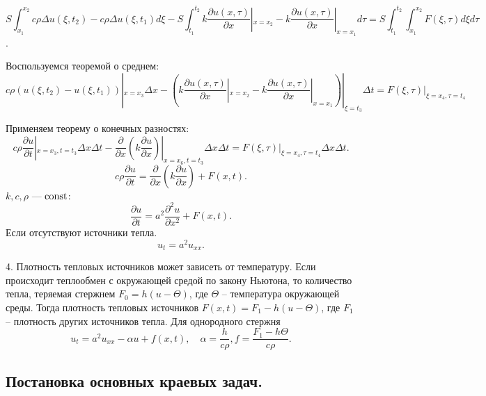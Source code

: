 \documentclass[9pt]{article}
\begin{document}
\[S\int_{x_1}^{x_2}c\rho\Delta u(\xi,t_2)-c\rho\Delta u(\xi,t_1)d\xi-S
\int_{t_1}^{t_2}k\dfrac{\partial u(x,\tau)}{\partial x}|_{x=x_2}-k\dfrac{\partial u(x,\tau)}{\partial x}|_{x=x_1}d\tau=S\int_{t_1}^{t_2}\int_{x_1}^{x_2}F(\xi,\tau)d\xi d\tau\].
\par Воспользуемся теоремой о среднем:
\[c\rho (u(\xi,t_2)-u(\xi,t_1))|_{x=x_3}\Delta x-(k\dfrac{\partial u(x,\tau)}{\partial x}|_{x=x_2}-k\dfrac{\partial u(x,\tau)}{\partial x}|_{x=x_1})|_{\xi=t_3}\Delta t=F(\xi,\tau)|_{\xi=x_4,\tau=t_4}\]
\par Применяем теорему о конечных разностях:
\[c\rho\dfrac{\partial u}{\partial t}|_{x=x_3,t=t_3}\Delta x\Delta t-\dfrac{\partial}{\partial x}(k\dfrac{\partial u}{\partial x})|_{x=x_6,t=t_3}\Delta x\Delta t=F(\xi,\tau)|_{\xi=x_4,\tau=t_4}\Delta x\Delta t.\]
\begin{equation}
    c\rho\dfrac{\partial u}{\partial t}=\dfrac{\partial}{\partial x}(k\dfrac{\partial u}{\partial x})+F(x,t).
\end{equation}
 \(k,c,\rho\) --- \(\operatorname{const}\):
\begin{equation}
    \dfrac{\partial u}{\partial t}=a^2\dfrac{\partial^2 u}{\partial x^2}+F(x,t).
\end{equation}
Если отсутствуют источники тепла.
\begin{equation}
    u_t=a^2u_{xx}.
\end{equation}
\par4. Плотность тепловых источников может зависеть от температуру. Если происходит теплообмен с окружающей средой по закону Ньютона, то количество тепла, теряемая стержнем \(F_0=h(u-\Theta)\), где \(\Theta\) -- температура окружающей среды. Тогда плотность тепловых источников \(F(x,t)=F_1-h(u-\Theta)\), где \(F_1\) -- плотность других источников тепла. Для однородного стержня
\begin{equation}
    u_t=a^2u_{xx}-\alpha u+f(x,t),\quad \alpha = \dfrac{h}{c\rho}, f=\dfrac{F_1-h\Theta}{c\rho}.
\end{equation}

\subsection{Постановка основных краевых задач.}
\end{document}
